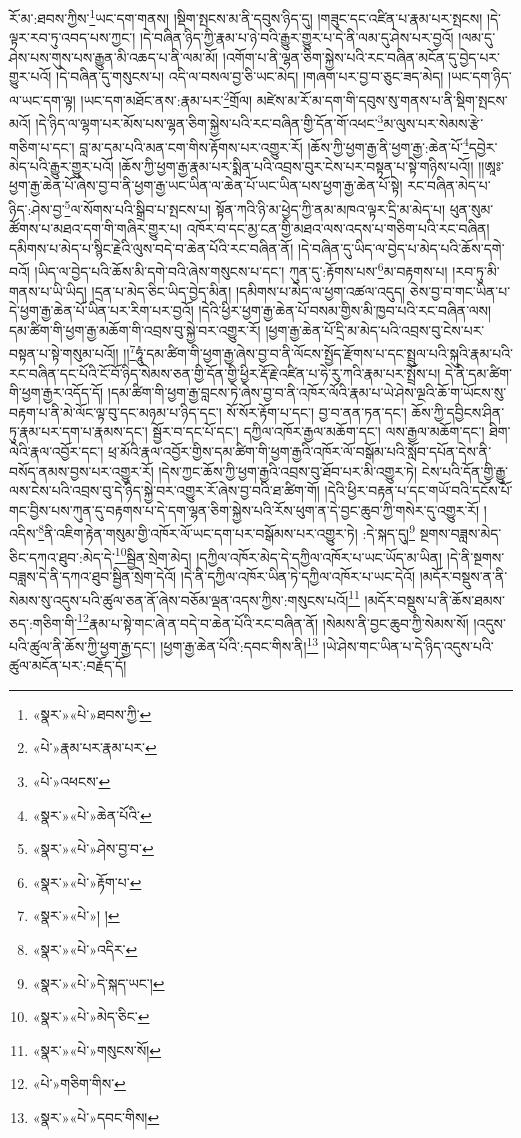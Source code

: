 རོ་མ་:ཐབས་ཀྱིས་\footnote{«སྣར་»«པེ་»ཐབས་ཀྱི་}ཡང་དག་གནས། །སྡིག་སྤངས་མ་ནི་དབུས་ཉིད་དུ། །གཟུང་དང་འཛིན་པ་རྣམ་པར་སྤངས། །དེ་ལྟར་རབ་ཏུ་འབད་པས་ཀྱང་། །དེ་བཞིན་ཉིད་ཀྱི་རྣམ་པ་ཉེ་བའི་རྒྱུར་གྱུར་པ་དེ་ནི་ལམ་དུ་ཤེས་པར་བྱའོ། །ལམ་དུ་ཤེས་པས་གུས་པས་རྒྱུན་མི་འཆད་པ་ནི་ལམ་མོ། །འགོག་པ་ནི་ལྷན་ཅིག་སྐྱེས་པའི་རང་བཞིན་མངོན་དུ་བྱེད་པར་གྱུར་པའོ། །དེ་བཞིན་དུ་གསུངས་པ། འདི་ལ་བསལ་བྱ་ཅི་ཡང་མེད། །གཞག་པར་བྱ་བ་ཅུང་ཟད་མེད། །ཡང་དག་ཉིད་ལ་ཡང་དག་ལྟ། །ཡང་དག་མཐོང་ནས་:རྣམ་པར་\footnote{«པེ་»རྣམ་པར་རྣམ་པར་}གྲོལ། མཛེས་མ་རོ་མ་དག་གི་དབུས་སུ་གནས་པ་ནི་སྡིག་སྤངས་མའོ། །དེ་ཉིད་ལ་ལྷག་པར་མོས་པས་ལྷན་ཅིག་སྐྱེས་པའི་རང་བཞིན་གྱི་དོན་གོ་འཕང་\footnote{«པེ་»འཕངས་}མ་ལུས་པར་སེམས་རྩེ་གཅིག་པ་དང་། བླ་མ་དམ་པའི་མན་ངག་གིས་རྟོགས་པར་འགྱུར་རོ། །ཆོས་ཀྱི་ཕྱག་རྒྱ་ནི་ཕྱག་རྒྱ་:ཆེན་པོ་\footnote{«སྣར་»«པེ་»ཆེན་པོའི་}དབྱེར་མེད་པའི་རྒྱུར་གྱུར་པའོ། །ཆོས་ཀྱི་ཕྱག་རྒྱ་རྣམ་པར་སྨིན་པའི་འབྲས་བུར་ངེས་པར་བསྟན་པ་སྟེ་གཉིས་པའོ།། །།ཨཱཿ་ཕྱག་རྒྱ་ཆེན་པོ་ཞེས་བྱ་བ་ནི་ཕྱག་རྒྱ་ཡང་ཡིན་ལ་ཆེན་པོ་ཡང་ཡིན་པས་ཕྱག་རྒྱ་ཆེན་པོ་སྟེ། རང་བཞིན་མེད་པ་ཉིད་:ཤེས་བྱ་\footnote{«སྣར་»«པེ་»ཤེས་བྱ་བ་}ལ་སོགས་པའི་སྒྲིབ་པ་སྤངས་པ། སྟོན་ཀའི་ཉི་མ་ཕྱེད་ཀྱི་ནམ་མཁའ་ལྟར་དྲི་མ་མེད་པ། ཕུན་སུམ་ཚོགས་པ་མཐའ་དག་གི་གཞིར་གྱུར་པ། འཁོར་བ་དང་མྱ་ངན་གྱི་མཐའ་ལས་འདས་པ་གཅིག་པའི་རང་བཞིན། དམིགས་པ་མེད་པ་སྙིང་རྗེའི་ལུས་བདེ་བ་ཆེན་པོའི་རང་བཞིན་ནོ། །དེ་བཞིན་དུ་ཡིད་ལ་བྱེད་པ་མེད་པའི་ཆོས་དགེ་བའོ། །ཡིད་ལ་བྱེད་པའི་ཆོས་མི་དགེ་བའི་ཞེས་གསུངས་པ་དང་། ཀུན་དུ་:རྟོགས་པས་\footnote{«སྣར་»«པེ་»རྟོག་པ་}མ་བརྟགས་པ། །རབ་ཏུ་མི་གནས་པ་ཡི་ཡིད། །དྲན་པ་མེད་ཅིང་ཡིད་བྱེད་མིན། །དམིགས་པ་མེད་ལ་ཕྱག་འཚལ་འདུད། ཅེས་བྱ་བ་གང་ཡིན་པ་དེ་ཕྱག་རྒྱ་ཆེན་པོ་ཡིན་པར་རིག་པར་བྱའོ། །དེའི་ཕྱིར་ཕྱག་རྒྱ་ཆེན་པོ་བསམ་གྱིས་མི་ཁྱབ་པའི་རང་བཞིན་ལས། དམ་ཚིག་གི་ཕྱག་རྒྱ་མཆོག་གི་འབྲས་བུ་སྐྱེ་བར་འགྱུར་རོ། །ཕྱག་རྒྱ་ཆེན་པོ་དྲི་མ་མེད་པའི་འབྲས་བུ་ངེས་པར་བསྟན་པ་སྟེ་གསུམ་པའོ།། །།\footnote{«སྣར་»«པེ་»། །}ཧཱུཾ་དམ་ཚིག་གི་ཕྱག་རྒྱ་ཞེས་བྱ་བ་ནི་ལོངས་སྤྱོད་རྫོགས་པ་དང་སྤྲུལ་པའི་སྐུའི་རྣམ་པའི་རང་བཞིན་དང་པོའི་ངོ་བོ་ཉིད་སེམས་ཅན་གྱི་དོན་གྱི་ཕྱིར་རྡོ་རྗེ་འཛིན་པ་ཧེ་རུ་ཀའི་རྣམ་པར་སྤྲོས་པ། དེ་ནི་དམ་ཚིག་གི་ཕྱག་རྒྱར་འདོད་དོ། །དམ་ཚིག་གི་ཕྱག་རྒྱ་བླངས་ཏེ་ཞེས་བྱ་བ་ནི་འཁོར་ལོའི་རྣམ་པ་ཡེ་ཤེས་ལྔའི་ཆོ་ག་ཡོངས་སུ་བརྟག་པ་ནི་མེ་ལོང་ལྟ་བུ་དང་མཉམ་པ་ཉིད་དང་། སོ་སོར་རྟོག་པ་དང་། བྱ་བ་ནན་ཏན་དང་། ཆོས་ཀྱི་དབྱིངས་ཤིན་ཏུ་རྣམ་པར་དག་པ་རྣམས་དང་། སྦྱོར་བ་དང་པོ་དང་། དཀྱིལ་འཁོར་རྒྱལ་མཆོག་དང་། ལས་རྒྱལ་མཆོག་དང་། ཐིག་ལེའི་རྣལ་འབྱོར་དང་། ཕྲ་མོའི་རྣལ་འབྱོར་གྱིས་དམ་ཚིག་གི་ཕྱག་རྒྱའི་འཁོར་ལོ་བསྒོམ་པའི་སློབ་དཔོན་དེས་ནི་བསོད་ནམས་བྱས་པར་འགྱུར་རོ། །དེས་ཀྱང་ཆོས་ཀྱི་ཕྱག་རྒྱའི་འབྲས་བུ་ཐོབ་པར་མི་འགྱུར་ཏེ། ངེས་པའི་དོན་གྱི་རྒྱུ་ལས་ངེས་པའི་འབྲས་བུ་དེ་ཉིད་སྐྱེ་བར་འགྱུར་རོ་ཞེས་བྱ་བའི་ཐ་ཚིག་གོ། །དེའི་ཕྱིར་བརྟན་པ་དང་གཡོ་བའི་དངོས་པོ་གང་བྱིས་པས་ཀུན་དུ་བརྟགས་པ་དེ་དག་ལྷན་ཅིག་སྐྱེས་པའི་རོས་ཕུག་ན་དེ་བྱང་ཆུབ་ཀྱི་གསེར་དུ་འགྱུར་རོ། །འདིས་\footnote{«སྣར་»«པེ་»འདིར་}ནི་འཇིག་རྟེན་གསུམ་གྱི་འཁོར་ལོ་ཡང་དག་པར་བསྒོམས་པར་འགྱུར་ཏེ། :དེ་སྐད་དུ།\footnote{«སྣར་»«པེ་»དེ་སྐད་ཡང་།} སྔགས་བཟླས་མེད་ཅིང་དཀའ་ཐུབ་:མེད་དེ་\footnote{«སྣར་»«པེ་»མེད་ཅིང་}སྦྱིན་སྲེག་མེད། །དཀྱིལ་འཁོར་མེད་དེ་དཀྱིལ་འཁོར་པ་ཡང་ཡོད་མ་ཡིན། །དེ་ནི་སྔགས་བཟླས་དེ་ནི་དཀའ་ཐུབ་སྦྱིན་སྲེག་དེའོ། །དེ་ནི་དཀྱིལ་འཁོར་ཡིན་ཏེ་དཀྱིལ་འཁོར་པ་ཡང་དེའོ། །མདོར་བསྡུས་ན་ནི་སེམས་སུ་འདུས་པའི་ཚུལ་ཅན་ནོ་ཞེས་བཅོམ་ལྡན་འདས་ཀྱིས་:གསུངས་པའོ།\footnote{«སྣར་»«པེ་»གསུངས་སོ།} །མདོར་བསྡུས་པ་ནི་ཆོས་ཐམས་ཅད་:གཅིག་གི་\footnote{«པེ་»གཅིག་གིས་}རྣམ་པ་སྟེ་གང་ཞེ་ན་བདེ་བ་ཆེན་པོའི་རང་བཞིན་ནོ། །སེམས་ནི་བྱང་ཆུབ་ཀྱི་སེམས་སོ། །འདུས་པའི་ཚུལ་ནི་ཆོས་ཀྱི་ཕྱག་རྒྱ་དང་། །ཕྱག་རྒྱ་ཆེན་པོའི་:དབང་གིས་ནི།\footnote{«སྣར་»«པེ་»དབང་གིས།} །ཡེ་ཤེས་གང་ཡིན་པ་དེ་ཉིད་འདུས་པའི་ཚུལ་མངོན་པར་:བརྗོད་དོ། 